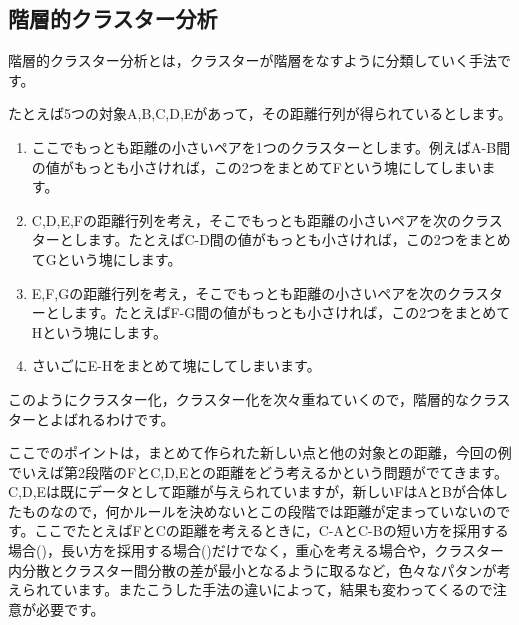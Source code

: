 \documentclass{ltjsbook}
\begin{document}
\subsection{階層的クラスター分析}
階層的クラスター分析とは，クラスターが階層をなすように分類していく手法です。

たとえば5つの対象A,B,C,D,Eがあって，その距離行列が得られているとします。
\begin{enumerate}
    \item ここでもっとも距離の小さいペアを1つのクラスターとします。例えばA-B間の値がもっとも小さければ，この2つをまとめてFという塊にしてしまいます。
    \item C,D,E,Fの距離行列を考え，そこでもっとも距離の小さいペアを次のクラスターとします。たとえばC-D間の値がもっとも小さければ，この2つをまとめてGという塊にします。
    \item E,F,Gの距離行列を考え，そこでもっとも距離の小さいペアを次のクラスターとします。たとえばF-G間の値がもっとも小さければ，この2つをまとめてHという塊にします。
    \item さいごにE-Hをまとめて塊にしてしまいます。
\end{enumerate}
このようにクラスター化，クラスター化を次々重ねていくので，階層的なクラスターとよばれるわけです。

ここでのポイントは，まとめて作られた新しい点と他の対象との距離，今回の例でいえば第2段階のFとC,D,Eとの距離をどう考えるかという問題がでてきます。C,D,Eは既にデータとして距離が与えられていますが，新しいFはAとBが合体したものなので，何かルールを決めないとこの段階では距離が定まっていないのです。ここでたとえばFとCの距離を考えるときに，C-AとC-Bの短い方を採用する場合()，長い方を採用する場合()だけでなく，重心を考える場合や，クラスター内分散とクラスター間分散の差が最小となるように取るなど，色々なパタンが考えられています。またこうした手法の違いによって，結果も変わってくるので注意が必要です。
\end{document}
